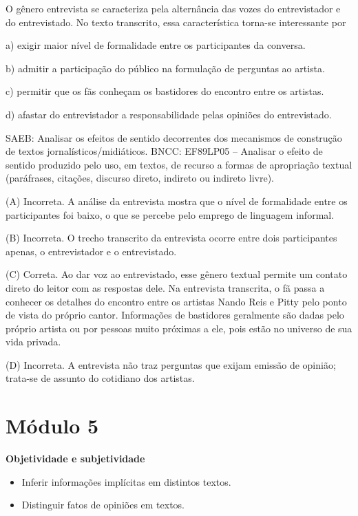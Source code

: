 O gênero entrevista se caracteriza pela alternância das vozes do
entrevistador e do entrevistado. No texto transcrito, essa
característica torna-se interessante por

a) exigir maior nível de formalidade entre os participantes da conversa.

b) admitir a participação do público na formulação de perguntas ao
artista.

c) permitir que os fãs conheçam os bastidores do encontro entre os
artistas.

d) afastar do entrevistador a responsabilidade pelas opiniões do
entrevistado.

SAEB: Analisar os efeitos de sentido decorrentes dos mecanismos de
construção de textos jornalísticos/midiáticos. BNCC: EF89LP05 --
Analisar o efeito de sentido produzido pelo uso, em textos, de recurso a
formas de apropriação textual (paráfrases, citações, discurso direto,
indireto ou indireto livre).

(A) Incorreta. A análise da entrevista mostra que o nível de formalidade
entre os participantes foi baixo, o que se percebe pelo emprego de
linguagem informal.

(B) Incorreta. O trecho transcrito da entrevista ocorre entre dois
participantes apenas, o entrevistador e o entrevistado.

(C) Correta. Ao dar voz ao entrevistado, esse gênero textual permite um
contato direto do leitor com as respostas dele. Na entrevista
transcrita, o fã passa a conhecer os detalhes do encontro entre os
artistas Nando Reis e Pitty pelo ponto de vista do próprio cantor.
Informações de bastidores geralmente são dadas pelo próprio artista ou
por pessoas muito próximas a ele, pois estão no universo de sua vida
privada.

(D) Incorreta. A entrevista não traz perguntas que exijam emissão de
opinião; trata-se de assunto do cotidiano dos artistas.

\hypertarget{muxf3dulo-5}{%
\section{Módulo 5}\label{muxf3dulo-5}}

\textbf{Objetividade e subjetividade}


\begin{itemize}
\tightlist
\item
  Inferir informações implícitas em distintos textos.
\item
  Distinguir fatos de opiniões em textos.
\end{itemize}

